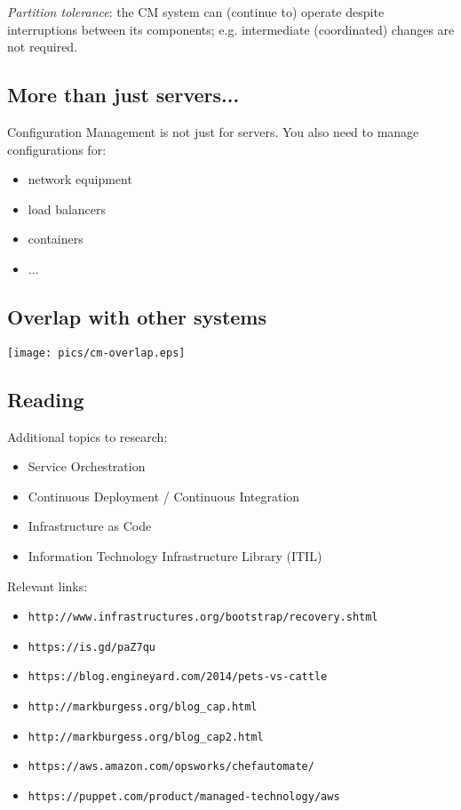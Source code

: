 \documentclass[xga]{xdvislides}
\begin{document}
{\em Partition tolerance}: the CM system can (continue
to) operate despite interruptions between its
components; e.g. intermediate (coordinated) changes
are not required.

\subsection{More than just servers...}
Configuration Management is not just for servers.  You
also need to manage configurations for:
\vspace{.25in}

\begin{itemize}
	\item network equipment
	\item load balancers
	\item containers
	\item ...
\end{itemize}

\subsection{Overlap with other systems}
\vspace*{\fill}
\begin{center}
	\texttt{[image: pics/cm-overlap.eps]} \\
\end{center}
\vspace*{\fill}


\subsection{Reading}

Additional topics to research:
\begin{itemize}
	\item Service Orchestration
	\item Continuous Deployment / Continuous Integration
	\item Infrastructure as Code
	\item Information Technology Infrastructure Library (ITIL)
\end{itemize}
\vspace{.25in}

Relevant links:
\begin{itemize}
	\item {\tt http://www.infrastructures.org/bootstrap/recovery.shtml}
	\item {\tt https://is.gd/paZ7qu}
	\item {\tt https://blog.engineyard.com/2014/pets-vs-cattle}
	\item {\tt http://markburgess.org/blog\_cap.html}
	\item {\tt http://markburgess.org/blog\_cap2.html}
	\item {\tt https://aws.amazon.com/opsworks/chefautomate/}
	\item {\tt https://puppet.com/product/managed-technology/aws}
\end{itemize}
\end{document}
